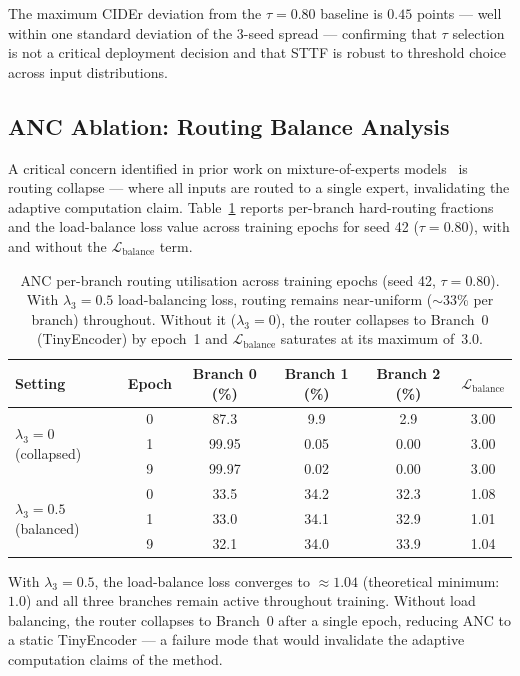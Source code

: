 \documentclass{article}
\begin{document}
The maximum CIDEr deviation from the $\tau{=}0.80$ baseline is $0.45$ points — well within one standard deviation of the 3-seed spread — confirming that $\tau$ selection is not a critical deployment decision and that STTF is robust to threshold choice across input distributions.



\subsection{ANC Ablation: Routing Balance Analysis}

A critical concern identified in prior work on mixture-of-experts models~\cite{fedus2022switch} is routing collapse — where all inputs are routed to a single expert, invalidating the adaptive computation claim.
Table~\ref{tab:anc_routing} reports per-branch hard-routing fractions and the load-balance loss value across training epochs for seed 42 ($\tau{=}0.80$), with and without the $\mathcal{L}_{\text{balance}}$ term.

\begin{table}[htbp]
\centering
\caption{ANC per-branch routing utilisation across training epochs (seed 42, $\tau{=}0.80$). With $\lambda_3{=}0.5$ load-balancing loss, routing remains near-uniform ($\sim$33\% per branch) throughout. Without it ($\lambda_3{=}0$), the router collapses to Branch~0 (TinyEncoder) by epoch~1 and $\mathcal{L}_{\text{balance}}$ saturates at its maximum of~3.0.}
\label{tab:anc_routing}
\begin{tabular}{lccccc}
\toprule
Setting & Epoch & Branch 0 (\%) & Branch 1 (\%) & Branch 2 (\%) & $\mathcal{L}_{\text{balance}}$ \\
\midrule
\multirow{3}{*}{$\lambda_3=0$ (collapsed)} & 0 & 87.3 & 9.9 & 2.9 & 3.00 \\
 & 1 & 99.95 & 0.05 & 0.00 & 3.00 \\
 & 9 & 99.97 & 0.02 & 0.00 & 3.00 \\
\midrule
\multirow{3}{*}{$\lambda_3=0.5$ (balanced)} & 0 & 33.5 & 34.2 & 32.3 & 1.08 \\
 & 1 & 33.0 & 34.1 & 32.9 & 1.01 \\
 & 9 & 32.1 & 34.0 & 33.9 & 1.04 \\
\bottomrule
\end{tabular}
\end{table}

With $\lambda_3{=}0.5$, the load-balance loss converges to $\approx 1.04$ (theoretical minimum: $1.0$) and all three branches remain active throughout training.
Without load balancing, the router collapses to Branch~0 after a single epoch, reducing ANC to a static TinyEncoder — a failure mode that would invalidate the adaptive computation claims of the method.
\end{document}
